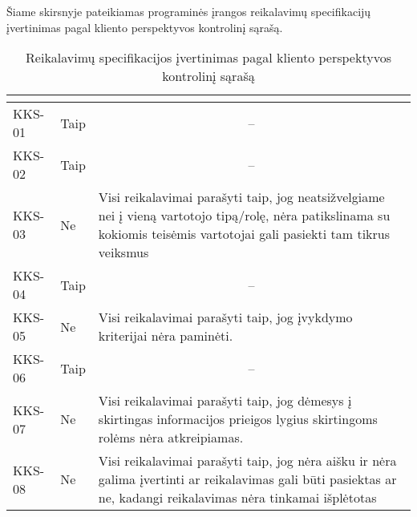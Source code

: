 \documentclass{VUMIFPSkursinis}
\begin{document}
Šiame skirsnyje pateikiamas programinės įrangos reikalavimų specifikacijų įvertinimas pagal kliento perspektyvos kontrolinį sąrašą.
\begin{center}

	\begin{longtable}{|C{2cm}|L{2.5cm}|L{10cm}|}

		\caption{Reikalavimų specifikacijos įvertinimas pagal kliento perspektyvos kontrolinį sąrašą}
		\label{table:KKS}

		\\ \hline
		 &
		 &
		\\ \hline
		KKS-01                                          &
		Taip                                            &
		\\ \hline

		KKS-02                                          &
		Taip                                            &
		\\ \hline

		KKS-03                                          &
		Ne                                              &
		Visi reikalavimai parašyti taip, jog neatsižvelgiame nei į vieną vartotojo tipą/rolę, nėra patikslinama su kokiomis teisėmis vartotojai gali pasiekti tam tikrus veiksmus
		\\ \hline

		KKS-04                                          &
		Taip                                            &
		\\ \hline

		KKS-05                                          &
		Ne                                              &
		Visi reikalavimai parašyti taip, jog įvykdymo kriterijai nėra paminėti.
		\\ \hline

		KKS-06                                          &
		Taip                                            &
		\\ \hline

		KKS-07                                          &
		Ne                                              &
		Visi reikalavimai parašyti taip, jog dėmesys į skirtingas informacijos prieigos lygius skirtingoms rolėms nėra atkreipiamas.
		\\ \hline

		KKS-08                                          &
		Ne                                              &
		Visi reikalavimai parašyti taip, jog nėra aišku ir nėra galima įvertinti ar reikalavimas gali būti pasiektas ar ne, kadangi reikalavimas nėra tinkamai išplėtotas
		\\ \hline
	\end{longtable}
\end{center}
\end{document}
